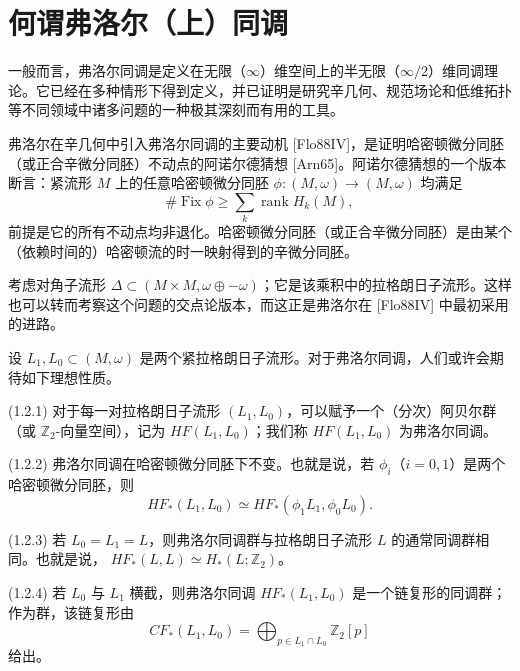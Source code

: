 
\section{何谓弗洛尔（上）同调}
\label{sec:1-1}

一般而言，弗洛尔同调是定义在无限（$\infty$）维空间上的半无限（$\infty/2$）维同调理论。它已经在多种情形下得到定义，并已证明是研究辛几何、规范场论和低维拓扑等不同领域中诸多问题的一种极其深刻而有用的工具。

弗洛尔在辛几何中引入弗洛尔同调的主要动机 [Flo88IV]，是证明哈密顿微分同胚（或正合辛微分同胚）不动点的阿诺尔德猜想 [Arn65]。阿诺尔德猜想的一个版本断言：紧流形 $M$ 上的任意哈密顿微分同胚
$\phi\colon(M,\omega)\to(M,\omega)$ 均满足
\begin{equation}
  \#\operatorname{Fix}\phi \geq \sum_k \operatorname{rank} H_k(M),
  \tag{1.1}\label{eq:1-1}
\end{equation}
前提是它的所有不动点均非退化。哈密顿微分同胚（或正合辛微分同胚）是由某个（依赖时间的）哈密顿流的时一映射得到的辛微分同胚。

考虑对角子流形
$\Delta\subset(M\times M,\omega\oplus-\omega)$；它是该乘积中的拉格朗日子流形。这样也可以转而考察这个问题的交点论版本，而这正是弗洛尔在 [Flo88IV] 中最初采用的进路。

设 $L_1,L_0\subset(M,\omega)$ 是两个紧拉格朗日子流形。对于弗洛尔同调，人们或许会期待如下理想性质。

\par\smallskip\noindent\textup{(1.2.1)}\quad
对于每一对拉格朗日子流形 $(L_1,L_0)$，可以赋予一个（分次）阿贝尔群（或 $\mathbb Z_2$-向量空间），记为 $HF(L_1,L_0)$；我们称 $HF(L_1,L_0)$ 为弗洛尔同调。

\par\smallskip\noindent\textup{(1.2.2)}\quad
弗洛尔同调在哈密顿微分同胚下不变。也就是说，若 $\phi_i$（$i=0,1$）是两个哈密顿微分同胚，则
\[
  HF_*(L_1,L_0)\simeq HF_*(\phi_1L_1,\phi_0L_0).
\]

\par\smallskip\noindent\textup{(1.2.3)}\quad
若 $L_0=L_1=L$，则弗洛尔同调群与拉格朗日子流形 $L$ 的通常同调群相同。也就是说，
$HF_*(L,L)\simeq H_*(L;\mathbb Z_2)$。

\par\smallskip\noindent\textup{(1.2.4)}\quad
若 $L_0$ 与 $L_1$ 横截，则弗洛尔同调 $HF_*(L_1,L_0)$ 是一个链复形的同调群；作为群，该链复形由
\begin{equation}
  CF_*(L_1,L_0)=\bigoplus_{p\in L_1\cap L_0}\mathbb Z_2[p]
  \tag{1.3}\label{eq:1-3}
\end{equation}
给出。

